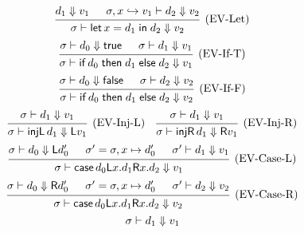 \documentclass{article}
\newcommand{\evalsto}{\mathrel{\mathop{\Downarrow}}}
\newcommand{\hooksto}{\mathrel{\mathop{\hookrightarrow}}}
\newcommand{\entails}{\mathrel{\mathop{\vdash}}}
\newcommand{\fin}{\mathrel{\mathop{\mathsf{in}}}}
\newcommand{\flet}{\operatorname{\mathsf{let}}}
\newcommand{\inl}{\operatorname{\mathsf{injL}}}
\newcommand{\inr}{\operatorname{\mathsf{injR}}}
\newcommand{\fif}{\operatorname{\mathsf{if}}}
\newcommand{\fthen}{\mathrel{\mathop{\mathsf{then}}}}
\newcommand{\felse}{\mathrel{\mathop{\mathsf{else}}}}
\newcommand{\fcase}{\operatorname{\mathsf{case}}}
\newcommand{\fcaseL}{\mathsf{L}}
\newcommand{\fcaseR}{\mathsf{R}}
\begin{document}
\begin{enumerate}
\[    \]
    \[
      \begin{prooftree}
        \hypo{d_1 \evalsto v_1}
        \hypo{\sigma, x \hooksto v_1 \entails d_2 \evalsto v_2}
        \infer2[(EV-Let)]{
          \sigma \entails\flet x = d_1 \fin d_2
          \evalsto
          v_2
        }
      \end{prooftree}
    \]
    \[
      \begin{prooftree}
        \hypo{\sigma \entails d_0 \evalsto \mathsf{true}}
        \hypo{\sigma \entails d_1 \evalsto v_1}
        \infer2[(EV-If-T)]{
          \sigma \entails
          \fif d_0 \fthen d_1 \felse d_2 \evalsto v_1
        }
      \end{prooftree}
    \]
    \[
      \begin{prooftree}
        \hypo{\sigma \entails d_0 \evalsto \mathsf{false}}
        \hypo{\sigma \entails d_2 \evalsto v_2}
        \infer2[(EV-If-F)]{
          \sigma \entails
          \fif d_0 \fthen d_1 \felse d_2 \evalsto v_2
        }
      \end{prooftree}
    \]
    \[
      \begin{prooftree}
        \hypo{\sigma \entails d_1 \evalsto v_1}
        \infer1[(EV-Inj-L)]{
          \sigma \entails \inl d_1 \evalsto \fcaseL v_1
        }
      \end{prooftree}
      \quad
      \begin{prooftree}
        \hypo{\sigma \entails d_1 \evalsto v_1}
        \infer1[(EV-Inj-R)]{
          \sigma \entails \inr d_1 \evalsto \fcaseR v_1
        }
      \end{prooftree}
    \]
    \[
      \begin{prooftree}
        \hypo{\sigma \entails d_0 \evalsto \fcaseL d_0'}
        \hypo{\sigma' = \sigma, x \mapsto d_0'}
        \hypo{\sigma' \entails d_1 \evalsto v_1}
        \infer3[(EV-Case-L)]{
          \sigma \entails
          \fcase d_0 \fcaseL x . d_1 \fcaseR x . d_2 \evalsto v_1
        }
      \end{prooftree}
    \]
    \[
      \begin{prooftree}
        \hypo{\sigma \entails d_0 \evalsto \fcaseR d_0'}
        \hypo{\sigma' = \sigma, x \mapsto d_0'}
        \hypo{\sigma' \entails d_2 \evalsto v_2}
        \infer3[(EV-Case-R)]{
          \sigma \entails
          \fcase d_0 \fcaseL x . d_1 \fcaseR x . d_2 \evalsto v_2
        }
      \end{prooftree}
    \]
    \[
      \begin{prooftree}
        \hypo{\sigma \entails d_1 \evalsto v_1}

\end{prooftree}\]
\end{enumerate}
\end{document}
